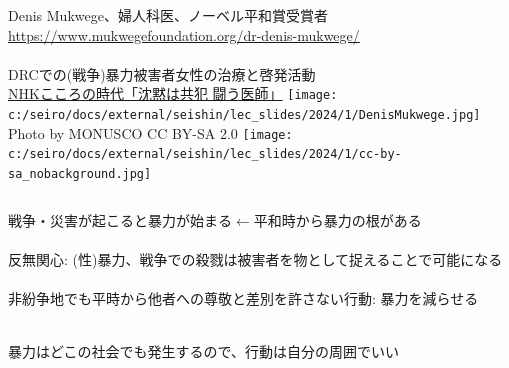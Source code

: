\begin{frame}[t, label=DenisMukwege]{}
\begin{columns}[T]
Denis Mukwege、婦人科医、ノーベル平和賞受賞者 {\scriptsize\url{https://www.mukwegefoundation.org/dr-denis-mukwege/}} \\~\\
DRCでの(戦争)暴力被害者女性の治療と啓発活動\\
\hyperlink{https://www.nhk.jp/p/ts/X83KJR6973/episode/te/VW23V46YQ4/}{NHKこころの時代「沈黙は共犯 闘う医師」}
\hfil\texttt{[image: c:/seiro/docs/external/seishin/lec\_slides/2024/1/DenisMukwege.jpg]}\\
\hfil{\scriptsize Photo by MONUSCO CC BY-SA 2.0} \texttt{[image: c:/seiro/docs/external/seishin/lec\_slides/2024/1/cc-by-sa\_nobackground.jpg]}\\
\end{columns}
\pause
\vspace{2ex}
戦争・災害が起こると暴力が始まる\pause$\leftarrow$平和時から暴力の根がある\\~\\
\pause
反無関心: (性)暴力、戦争での殺戮は被害者を物として捉えることで可能になる\\~\\
\pause
非紛争地でも平時から他者への尊敬と差別を許さない行動: 暴力を減らせる\\~\\
\pause
\begin{dinglist}{43}
\vspace{1.0ex}\setlength{\itemsep}{1.0ex}\setlength{\baselineskip}{12pt}
\item	暴力はどこの社会でも発生するので、行動は自分の周囲でいい
\end{dinglist}
\end{frame}

